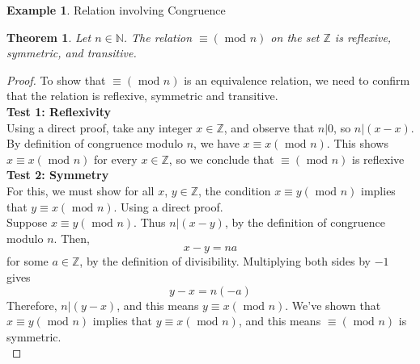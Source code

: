 \documentclass{book}
\newtheorem{theorem}{Theorem}[section]
\theoremstyle{definition}
\newtheorem{example}{Example}[definition]
\theoremstyle{remark}
\newcommand{\bb}[1]{\mathbb{#1}}
\begin{document}
    \newpage
    \begin{example}
        Relation involving Congruence \\
        
        \begin{tcolorbox}
            \begin{theorem}
                Let $n \in \bb{N}$. The relation $\equiv (\text{ mod } n)$ on the set $\bb{Z}$ is reflexive, symmetric, and transitive.
            \end{theorem}
        \end{tcolorbox}
    
    
        \begin{proof}
             To show that $\equiv (\text{ mod } n)$ is an equivalence relation, we need to confirm that the relation is reflexive, symmetric and transitive. \\
             
            \textbf{Test 1: Reflexivity } \\    
                Using a direct proof, take any integer $x \in \bb{Z}$, and observe that $n|0$, so $n|(x-x)$. By definition of congruence modulo $n$, we have $x \equiv x (\text{ mod } n)$. This shows $x \equiv x (\text{ mod } n)$ for every $x \in \bb{Z}$, so we conclude that $\equiv (\text{ mod } n)$ is reflexive \\
    
            \textbf{Test 2: Symmetry } \\
                For this, we must show for all $x$, $y \in \bb{Z}$, the condition $x \equiv y (\text{ mod } n)$ implies that $y \equiv x (\text{ mod } n)$. Using a direct proof. \\
                Suppose $x \equiv y (\text{ mod } n)$. Thus $n |(x-y)$, by the definition of congruence modulo $n$. Then, 
                    \begin{equation*}
                        x-y = na         
                    \end{equation*}
                for some $a \in \bb{Z}$, by the definition of divisibility. Multiplying both sides by $-1$ gives
                    \begin{equation*}
                        y-x = n(-a)
                    \end{equation*}
                Therefore, $n |(y-x)$, and this means $y \equiv x (\text{ mod } n)$. We've shown that $x \equiv y (\text{ mod } n)$ implies that $y \equiv x (\text{ mod } n)$, and this means $\equiv (\text{ mod } n)$ is symmetric. \\
            

\end{proof}
\end{example}
\end{document}
